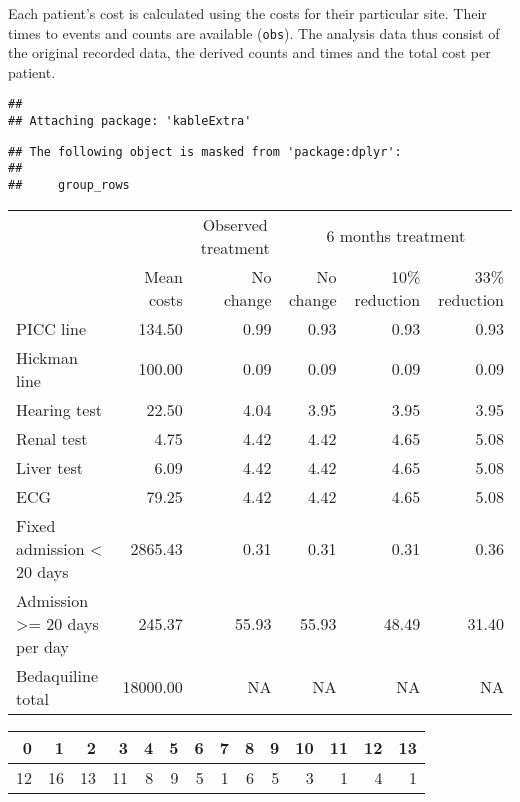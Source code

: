 \documentclass[]{article}
\begin{document}
Each patient's cost is calculated using the costs for their particular
site. Their times to events and counts are available (\texttt{obs}). The
analysis data thus consist of the original recorded data, the derived
counts and times and the total cost per patient.

\begin{verbatim}
## 
## Attaching package: 'kableExtra'
\end{verbatim}

\begin{verbatim}
## The following object is masked from 'package:dplyr':
## 
##     group_rows
\end{verbatim}

\begin{table}[H]
\centering
\begin{tabular}{l|r|r|r|r|r}
\hline
\multicolumn{1}{c|}{ } & \multicolumn{1}{c|}{ } & \multicolumn{1}{c|}{Observed treatment} & \multicolumn{3}{c}{6 months treatment} \\
\cline{3-3} \cline{4-6}
  & Mean costs & No change & No change & 10\% reduction & 33\% reduction\\
\hline
PICC line & 134.50 & 0.99 & 0.93 & 0.93 & 0.93\\
\hline
Hickman line & 100.00 & 0.09 & 0.09 & 0.09 & 0.09\\
\hline
Hearing test & 22.50 & 4.04 & 3.95 & 3.95 & 3.95\\
\hline
Renal test & 4.75 & 4.42 & 4.42 & 4.65 & 5.08\\
\hline
Liver test & 6.09 & 4.42 & 4.42 & 4.65 & 5.08\\
\hline
ECG & 79.25 & 4.42 & 4.42 & 4.65 & 5.08\\
\hline
Fixed admission < 20 days & 2865.43 & 0.31 & 0.31 & 0.31 & 0.36\\
\hline
Admission >= 20 days per day & 245.37 & 55.93 & 55.93 & 48.49 & 31.40\\
\hline
Bedaquiline total & 18000.00 & NA & NA & NA & NA\\
\hline
\end{tabular}
\end{table}

\begin{tabular}{r|r|r|r|r|r|r|r|r|r|r|r|r|r}
\hline
0 & 1 & 2 & 3 & 4 & 5 & 6 & 7 & 8 & 9 & 10 & 11 & 12 & 13\\
\hline
12 & 16 & 13 & 11 & 8 & 9 & 5 & 1 & 6 & 5 & 3 & 1 & 4 & 1\\
\hline
\end{tabular}
\end{document}
